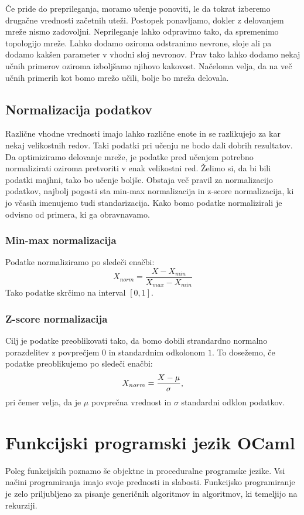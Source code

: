 \documentclass[mat1]{fmfdelo}
\begin{document}
Če pride do preprileganja, moramo učenje ponoviti, le da tokrat izberemo drugačne vrednosti začetnih uteži. Postopek ponavljamo, dokler z delovanjem mreže nismo zadovoljni. Neprileganje lahko odpravimo tako, da spremenimo topologijo mreže. Lahko dodamo oziroma odstranimo nevrone, sloje ali pa dodamo kakšen parameter v vhodni sloj nevronov. Prav tako lahko dodamo nekaj učnih primerov oziroma izboljšamo njihovo kakovost. Načeloma velja, da na več učnih primerih kot bomo mrežo učili, bolje bo mreža delovala.
%
\subsection{Normalizacija podatkov}
Različne vhodne vrednosti imajo lahko različne enote in se razlikujejo za kar nekaj velikostnih redov. Taki podatki pri učenju ne bodo dali dobrih rezultatov. Da optimiziramo delovanje mreže, je podatke pred učenjem potrebno normalizirati oziroma pretvoriti v enak velikostni red. Želimo si, da bi bili podatki majhni, tako bo učenje boljše. Obstaja več pravil za normalizacijo podatkov, najbolj pogosti sta min-max normalizacija in z-score normalizacija, ki jo včasih imenujemo tudi standarizacija. Kako bomo podatke normalizirali je odvisno od primera, ki ga obravnavamo.
%
\subsubsection{Min-max normalizacija}
Podatke normaliziramo po sledeči enačbi:
%
\begin{equation}
X_{norm} = \frac{X -X_{min}}{X_{max}-X_{min}}
\end{equation}
%
Tako podatke skrčimo na interval $[0,1]$. 
%
\subsubsection{Z-score normalizacija}
Cilj je podatke preoblikovati tako, da bomo dobili strandardno normalno porazdelitev z povprečjem $0$ in standardnim odkolonom $1$. To dosežemo, če podatke preoblikujemo po sledeči enačbi:
%
\begin{equation}
X_{norm} = \frac{X - \mu}{\sigma} \text,
\end{equation}
%
pri čemer velja, da je $\mu$  povprečna vrednost in $\sigma$ standardni odklon podatkov.
%
\section{Funkcijski programski jezik OCaml}
Poleg funkcijskih poznamo še objektne in proceduralne programske jezike. Vsi načini programiranja imajo svoje prednosti in slabosti. Funkcijsko programiranje je zelo priljubljeno za pisanje generičnih algoritmov in algoritmov, ki temeljijo na rekurziji. 
\end{document}
